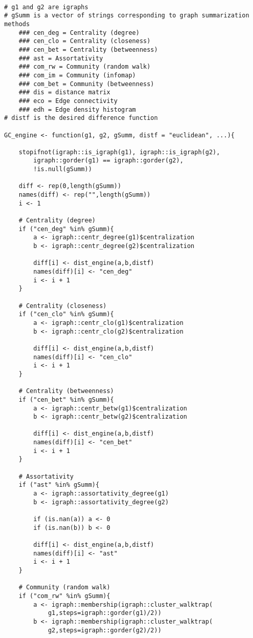 {
\begin{lstlisting}

# g1 and g2 are igraphs
# gSumm is a vector of strings corresponding to graph summarization methods
	### cen_deg = Centrality (degree)
	### cen_clo = Centrality (closeness)
	### cen_bet = Centrality (betweenness)
	### ast = Assortativity
	### com_rw = Community (random walk)
	### com_im = Community (infomap)
	### com_bet = Community (betweenness)
	### dis = distance matrix
	### eco = Edge connectivity
	### edh = Edge density histogram
# distf is the desired difference function

GC_engine <- function(g1, g2, gSumm, distf = "euclidean", ...){

	stopifnot(igraph::is_igraph(g1), igraph::is_igraph(g2), 
		igraph::gorder(g1) == igraph::gorder(g2),
		!is.null(gSumm))
	
	diff <- rep(0,length(gSumm))
	names(diff) <- rep("",length(gSumm))
	i <- 1
	
	# Centrality (degree)
	if ("cen_deg" %in% gSumm){
		a <- igraph::centr_degree(g1)$centralization
		b <- igraph::centr_degree(g2)$centralization
		
		diff[i] <- dist_engine(a,b,distf)
		names(diff)[i] <- "cen_deg"
		i <- i + 1
	}
	
	# Centrality (closeness)
	if ("cen_clo" %in% gSumm){
		a <- igraph::centr_clo(g1)$centralization
		b <- igraph::centr_clo(g2)$centralization
		
		diff[i] <- dist_engine(a,b,distf)
		names(diff)[i] <- "cen_clo"
		i <- i + 1
	}
	
	# Centrality (betweenness)
	if ("cen_bet" %in% gSumm){
		a <- igraph::centr_betw(g1)$centralization
		b <- igraph::centr_betw(g2)$centralization
		
		diff[i] <- dist_engine(a,b,distf)
		names(diff)[i] <- "cen_bet"
		i <- i + 1
	}
	
	# Assortativity
	if ("ast" %in% gSumm){
		a <- igraph::assortativity_degree(g1)
		b <- igraph::assortativity_degree(g2)
		
		if (is.nan(a)) a <- 0
		if (is.nan(b)) b <- 0
		
		diff[i] <- dist_engine(a,b,distf)
		names(diff)[i] <- "ast"
		i <- i + 1
	}
	
	# Community (random walk)
	if ("com_rw" %in% gSumm){
		a <- igraph::membership(igraph::cluster_walktrap(
			g1,steps=igraph::gorder(g1)/2))
		b <- igraph::membership(igraph::cluster_walktrap(
			g2,steps=igraph::gorder(g2)/2))
		

\end{lstlisting}}
